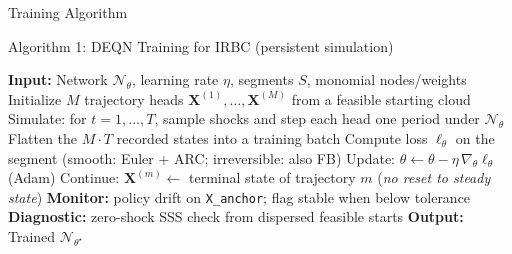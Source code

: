 \documentclass[aspectratio=169,11pt]{beamer}
\begin{document}
\begin{frame}{Training Algorithm}
\begin{block}{Algorithm 1: DEQN Training for IRBC (persistent simulation)}
\begin{algorithmic}
\footnotesize
\STATE \textbf{Input:} Network $\mathcal{N}_\theta$, learning rate $\eta$, segments $S$, monomial nodes/weights
\STATE Initialize $M$ trajectory heads $\bm{X}^{(1)}, \ldots, \bm{X}^{(M)}$ from a feasible starting cloud
    \STATE Simulate: for $t = 1, \ldots, T$, sample shocks and step each head one period under $\mathcal{N}_\theta$
    \STATE Flatten the $M\!\cdot\!T$ recorded states into a training batch
        \STATE Compute loss $\ell_\theta$ on the segment (smooth: Euler + ARC; irreversible: also FB)
        \STATE Update: $\theta \leftarrow \theta - \eta\,\nabla_\theta \ell_\theta$ (Adam)
    \ENDFOR
    \STATE Continue: $\bm{X}^{(m)} \leftarrow$ terminal state of trajectory $m$ (\emph{no reset to steady state})
    \STATE \textbf{Monitor:} policy drift on \texttt{X\_anchor}; flag stable when below tolerance
\ENDFOR
\STATE \textbf{Diagnostic:} zero-shock SSS check from dispersed feasible starts
\STATE \textbf{Output:} Trained $\mathcal{N}_{\theta^\star}$
\end{algorithmic}
\end{block}
\end{frame}
\end{document}
